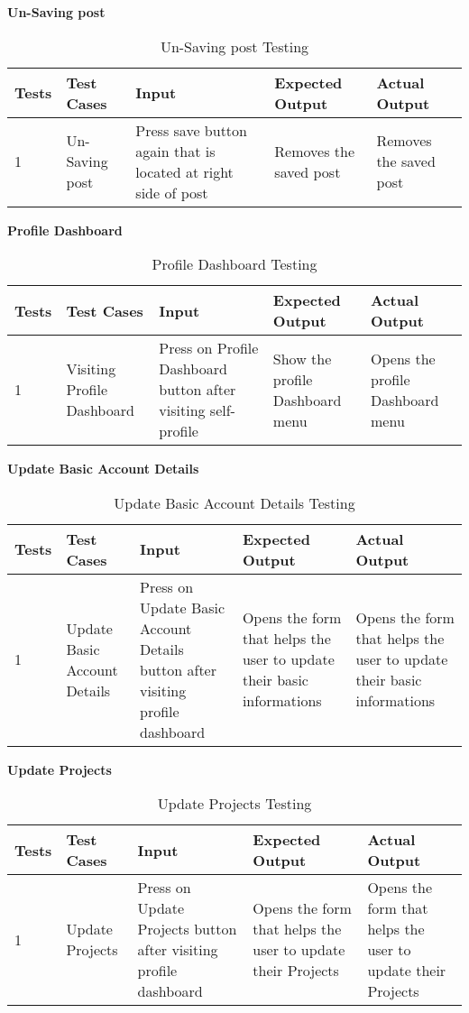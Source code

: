\textbf{Un-Saving post}\\
\begin{table}[H]
    \caption{Un-Saving post Testing}
        \label{}
    \begin{tabular}{|p{0.3in}|p{1.3in}|p{1.3in}|p{1.3in}|p{1in}|}
        \hline
        Tests & Test Cases & Input &Expected Output & Actual Output \\
        \hline
            1 &Un-Saving post & Press save button again that is located at right side of post & Removes the saved post &  Removes the saved post  \\
            \hline
\end{tabular}
\end{table}

\textbf{Profile Dashboard}\\
\begin{table}[H]
    \caption{Profile Dashboard Testing}
        \label{}
    \begin{tabular}{|p{0.3in}|p{1.3in}|p{1.3in}|p{1.3in}|p{1in}|}
        \hline
        Tests & Test Cases & Input &Expected Output & Actual Output \\
        \hline
            1 &Visiting Profile Dashboard & Press on Profile Dashboard button after visiting self-profile &Show the profile Dashboard menu &Opens the profile Dashboard menu  \\
            \hline
\end{tabular}
\end{table}

\textbf{Update Basic Account Details}\\
\begin{table}[H]
    \caption{Update Basic Account Details Testing}
        \label{}
    \begin{tabular}{|p{0.3in}|p{1.3in}|p{1.3in}|p{1.3in}|p{1in}|}
        \hline
        Tests & Test Cases & Input &Expected Output & Actual Output \\
        \hline
            1 &Update Basic Account Details & Press on Update Basic Account Details button after visiting profile dashboard &Opens the form that helps the user to update their basic informations  &Opens the form that helps the user to update their basic informations  \\
            \hline
\end{tabular}
\end{table}

\textbf{Update Projects}\\
\begin{table}[H]
    \caption{Update Projects Testing}
        \label{}
    \begin{tabular}{|p{0.3in}|p{1.3in}|p{1.3in}|p{1.3in}|p{1in}|}
        \hline
        Tests & Test Cases & Input &Expected Output & Actual Output \\
        \hline
            1 &Update Projects & Press on Update Projects button after visiting profile dashboard &Opens the form that helps the user to update their Projects  &Opens the form that helps the user to update their Projects  \\
            \hline
\end{tabular}
\end{table}

